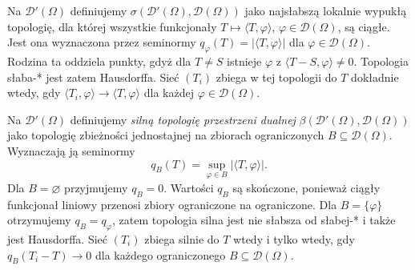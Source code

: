 \begin{definicja}
\label{def:weakstar19}
Na $\mathcal D'(\Omega)$ definiujemy
$\sigma(\mathcal D'(\Omega),\mathcal D(\Omega))$ jako
najsłabszą lokalnie wypukłą topologię, dla której
wszystkie funkcjonały $T\mapsto\langle T,\varphi\rangle$,
$\varphi\in\mathcal D(\Omega)$, są ciągłe.
Jest ona wyznaczona przez seminormy
$q_\varphi(T)=|\langle T,\varphi\rangle|$ dla $\varphi\in\mathcal D(\Omega)$.
Rodzina ta oddziela punkty, gdyż dla $T\ne S$ istnieje
$\varphi$ z $\langle T-S,\varphi\rangle\ne0$.
Topologia słaba-* jest zatem Hausdorffa.
Sieć $(T_i)$ zbiega w tej topologii do $T$ dokładnie wtedy,
gdy $\langle T_i,\varphi\rangle\to\langle T,\varphi\rangle$
dla każdej $\varphi\in\mathcal D(\Omega)$.
\end{definicja}

\begin{definicja}
\label{def:strong19}
Na $\mathcal D'(\Omega)$ definiujemy
\emph{silną topologię przestrzeni dualnej}
$\beta(\mathcal D'(\Omega),\mathcal D(\Omega))$
jako topologię zbieżności jednostajnej na zbiorach
ograniczonych $B\subseteq\mathcal D(\Omega)$.
Wyznaczają ją seminormy
\[q_B(T)=\sup_{\varphi\in B}|\langle T,\varphi\rangle|.\]
Dla $B=\varnothing$ przyjmujemy $q_B=0$.
Wartości $q_B$ są skończone, ponieważ ciągły funkcjonał
liniowy przenosi zbiory ograniczone na ograniczone.
Dla $B=\{\varphi\}$ otrzymujemy $q_B=q_\varphi$,
zatem topologia silna jest nie słabsza od słabej-*
i także jest Hausdorffa. Sieć $(T_i)$ zbiega silnie do $T$
wtedy i tylko wtedy, gdy $q_B(T_i-T)\to0$
dla każdego ograniczonego $B\subseteq\mathcal D(\Omega)$.
\end{definicja}

